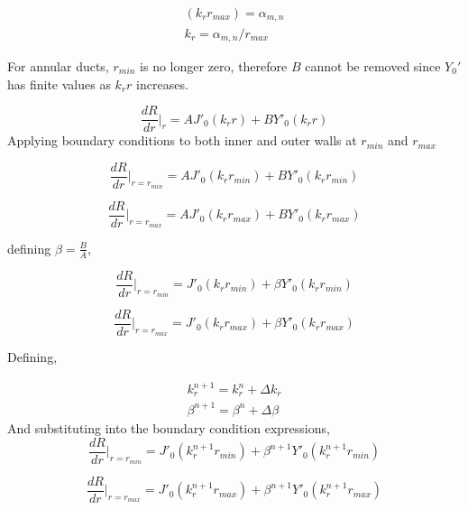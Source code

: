 \begin{align}
    (k_r r_{max})  = \alpha_{m,n} \\
    k_r = \alpha_{m,n}/r_{max}
\end{align}

For annular ducts, $r_{min}$ is no longer zero, therefore $B$ cannot be removed
since $Y_0'$ has finite values as $k_r r $ increases.

\begin{equation}
    \frac{dR}{dr}\Bigr|_{r} = A J'_0 (k_r r) + B Y'_0(k_r r ) 
    \label{eqn:besselsfunderivaTive}
\end{equation}
Applying boundary conditions to both inner and outer walls at $r_{min}$ and $r_{max}$

\begin{equation}
    \frac{dR}{dr}\Bigr|_{r=r_{min}} = A J'_0 (k_r r_{min}) + B Y'_0(k_r r_{min}) 
\end{equation}

\begin{equation}
    \frac{dR}{dr}\Bigr|_{r=r_{max}} = A J'_0 (k_r r_{max}) + B Y'_0(k_r r_{max}) 
\end{equation}

defining $\beta = \frac{B}{A}$,

\begin{equation}
    \frac{dR}{dr}\Bigr|_{r=r_{min}} =  J'_0 (k_r r_{min}) + \beta Y'_0(k_r r_{min}) 
\end{equation}

\begin{equation}
    \frac{dR}{dr}\Bigr|_{r=r_{max}} =  J'_0 (k_r r_{max}) + \beta Y'_0(k_r r_{max}) 
\end{equation}

Defining,

\begin{align*}
    k_r^{n+1} = k_r^n + \Delta k_r \\
    \beta^{n+1} = \beta^n + \Delta \beta 
\end{align*}
And substituting into the boundary condition expressions,
\begin{equation}
    \frac{dR}{dr}\Bigr|_{r=r_{min}} =  J'_0 (k_r^{n+1} r_{min}) + \beta^{n+1} Y'_0(k_r^{n+1} r_{min}) 
\end{equation}

\begin{equation}
    \frac{dR}{dr}\Bigr|_{r=r_{max}} =  J'_0 (k_r^{n+1} r_{max}) + \beta^{n+1} Y'_0(k_r^{n+1} r_{max}) 
\end{equation}

